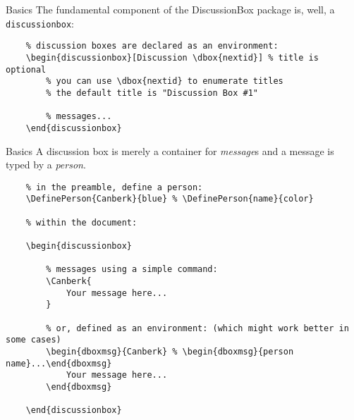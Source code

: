 \documentclass{article}
\begin{document}
\begin{discussionbox}

    \begin{dboxmsg}{Basics}
        The fundamental component of the DiscussionBox package is, well, a \texttt{discussionbox}:
        \begin{verbatim}
    % discussion boxes are declared as an environment:
    \begin{discussionbox}[Discussion \dbox{nextid}] % title is optional
        % you can use \dbox{nextid} to enumerate titles
        % the default title is "Discussion Box #1"

        % messages...
    \end{discussionbox}
        \end{verbatim}
    \end{dboxmsg}

    \begin{dboxmsg}{Basics}
        A discussion box is merely a container for \textit{message}s and a message is typed by a \textit{person}.

        \begin{verbatim}
    % in the preamble, define a person:
    \DefinePerson{Canberk}{blue} % \DefinePerson{name}{color}
    
    % within the document:

    \begin{discussionbox}

        % messages using a simple command:
        \Canberk{
            Your message here...
        }

        % or, defined as an environment: (which might work better in some cases)
        \begin{dboxmsg}{Canberk} % \begin{dboxmsg}{person name}...\end{dboxmsg}
            Your message here...
        \end{dboxmsg}

    \end{discussionbox}
        \end{verbatim}
    

\end{dboxmsg}
\end{discussionbox}
\end{document}
